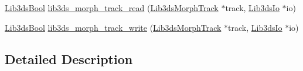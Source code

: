 \begin{DoxyCompactItemize}
\item 
\hyperlink{types_8h_a89dd7398a9ebbbf28011f8c32df67ad3}{Lib3ds\-Bool} \hyperlink{group__tracks_ga677bede0a186cb3d33cc6e52f738bf11}{lib3ds\-\_\-morph\-\_\-track\-\_\-read} (\hyperlink{struct_lib3ds_morph_track}{Lib3ds\-Morph\-Track} $\ast$track, \hyperlink{struct_lib3ds_io}{Lib3ds\-Io} $\ast$io)
\item 
\hyperlink{types_8h_a89dd7398a9ebbbf28011f8c32df67ad3}{Lib3ds\-Bool} \hyperlink{group__tracks_ga9abfbbf0376d92a1ef163a7e2442662d}{lib3ds\-\_\-morph\-\_\-track\-\_\-write} (\hyperlink{struct_lib3ds_morph_track}{Lib3ds\-Morph\-Track} $\ast$track, \hyperlink{struct_lib3ds_io}{Lib3ds\-Io} $\ast$io)
\end{DoxyCompactItemize}


\subsection{Detailed Description}


